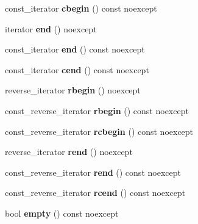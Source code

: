\begin{DoxyCompactItemize}
const\+\_\+iterator {\bfseries cbegin} () const noexcept
\item 
\mbox{\label{classtsl_1_1ordered__map_ac2d65a18a511916935054f255716df15}} 
iterator {\bfseries end} () noexcept
\item 
\mbox{\label{classtsl_1_1ordered__map_a0bafdbbda5413f9eaba0c851d16c933d}} 
const\+\_\+iterator {\bfseries end} () const noexcept
\item 
\mbox{\label{classtsl_1_1ordered__map_a4feacd4d503959dab61cbc4b50d0e3a4}} 
const\+\_\+iterator {\bfseries cend} () const noexcept
\item 
\mbox{\label{classtsl_1_1ordered__map_a8ab19cbd249cce737cffa61f4116458e}} 
reverse\+\_\+iterator {\bfseries rbegin} () noexcept
\item 
\mbox{\label{classtsl_1_1ordered__map_ad4f075fd471b1e180ed09a37c23f7fd7}} 
const\+\_\+reverse\+\_\+iterator {\bfseries rbegin} () const noexcept
\item 
\mbox{\label{classtsl_1_1ordered__map_a9cfe9c75011564558c611c52d1151349}} 
const\+\_\+reverse\+\_\+iterator {\bfseries rcbegin} () const noexcept
\item 
\mbox{\label{classtsl_1_1ordered__map_a56af63a4b10d1d1a55696bdf48890d71}} 
reverse\+\_\+iterator {\bfseries rend} () noexcept
\item 
\mbox{\label{classtsl_1_1ordered__map_add2bdaf336764b61ca1e15f562bc5b5a}} 
const\+\_\+reverse\+\_\+iterator {\bfseries rend} () const noexcept
\item 
\mbox{\label{classtsl_1_1ordered__map_a65d582aafd7ec1c757c600027eccc3c0}} 
const\+\_\+reverse\+\_\+iterator {\bfseries rcend} () const noexcept
\item 
\mbox{\label{classtsl_1_1ordered__map_ac7a08803cdc5f6fa7b752a1959c4434f}} 
bool {\bfseries empty} () const noexcept
\item 

\end{DoxyCompactItemize}
